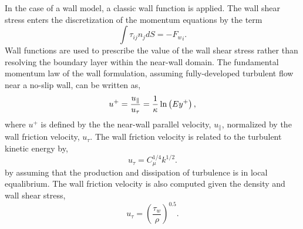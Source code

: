 In the case of a wall model, a classic wall function is applied.
The wall shear stress enters the discretization of the momentum equations 
by the term
%
\begin{equation}
        \int \tau_{ij} n_j dS = -{F_w}_i .
 \label{wall_shear1}
\end{equation}
%
Wall functions are used to prescribe the value of the wall shear 
stress rather than resolving the boundary layer within the near-wall 
domain. The fundamental momentum law of the wall formulation, assuming 
fully-developed turbulent flow near a no-slip wall, can be written as,
%
\begin{equation}
u^+ = {u_{\|} \over u_{\tau}} 
    = { 1 \over \kappa } \ln \left(Ey^+\right) ,
\label{law_wall}
\end{equation}
%
where $u^+$ is defined by the the near-wall parallel velocity, $u_{\|}$, normalized 
by the wall friction velocity, $u_{\tau}$. The wall friction velocity is
related to the turbulent kinetic energy by,
%
\begin{equation} 
        u_{\tau} = C_\mu^{1/4} k^{1/2}.
\label{utau}
\end{equation}
%
by assuming that the production and dissipation of turbulence is in local 
equalibrium.  The wall friction velocity is also computed given the density and wall shear stress,
\begin{equation} 
        u_\tau = (\frac{\tau_w} {\rho})^{0.5}.
\end{equation}


